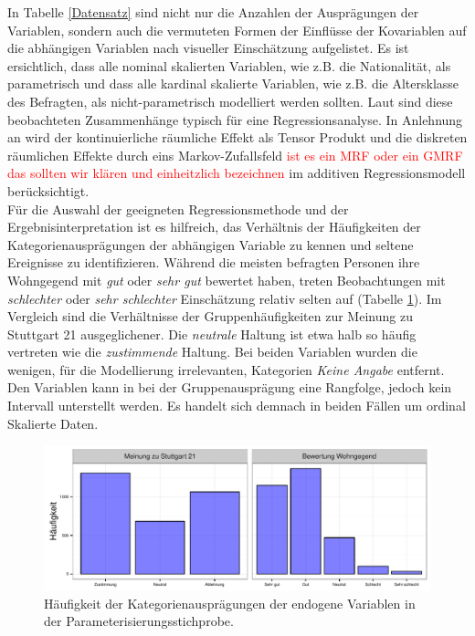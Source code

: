 \documentclass{Vorlage}
\begin{document}
In Tabelle \ref{Datensatz} sind nicht nur die Anzahlen der Ausprägungen der Variablen, sondern auch die vermuteten 
Formen der Einflüsse der Kovariablen auf die abhängigen Variablen nach visueller Einschätzung aufgelistet. Es ist 
ersichtlich, dass alle nominal skalierten Variablen, wie z.B. die Nationalität, als parametrisch und dass 
alle kardinal skalierte Variablen, wie z.B. die Altersklasse des Befragten, als nicht-parametrisch 
modelliert werden sollten. Laut \cite[p.9]{fahrmeir2009regression} sind diese beobachteten Zusammenhänge typisch für 
eine Regressionsanalyse. In Anlehnung an \cite[p. 503 ff. \& p. 524 ff.]{fahrmeir2013regression} wird der 
kontinuierliche räumliche Effekt als Tensor Produkt und die diskreten räumlichen Effekte durch eins 
Markov-Zufallsfeld \textcolor{red}{ist es ein MRF oder ein GMRF das sollten wir klären und einheitzlich bezeichnen} 
im additiven Regressionsmodell berücksichtigt.\\
Für die Auswahl der geeigneten Regressionsmethode und der Ergebnisinterpretation ist es hilfreich, das Verhältnis der 
Häufigkeiten der Kategorienausprägungen der abhängigen Variable zu kennen und seltene Ereignisse zu identifizieren. 
Während die meisten befragten Personen ihre Wohngegend mit \textit{gut} oder \textit{sehr gut} bewertet haben, treten 
Beobachtungen mit \textit{schlechter} oder \textit{sehr schlechter} Einschätzung relativ selten auf (Tabelle 
\ref{endogene}). Im Vergleich sind die Verhältnisse der Gruppenhäufigkeiten zur Meinung zu Stuttgart 21 
ausgeglichener. Die \textit{neutrale} Haltung ist etwa halb so häufig vertreten wie die \textit{zustimmende} Haltung. 
Bei beiden Variablen wurden die wenigen, für die Modellierung irrelevanten, Kategorien 
\textit{Keine Angabe} entfernt. Den Variablen kann in bei der Gruppenausprägung eine Rangfolge, jedoch kein 
Intervall unterstellt werden. Es handelt sich demnach in beiden Fällen um ordinal Skalierte Daten.

\begin{figure}[h]
 \begin{center}
 \includegraphics[scale=0.8]{Pictures/BarResp}
 \caption{Häufigkeit der Kategorienausprägungen der endogene Variablen in der Parameterisierungsstichprobe.}
 \label{endogene}
 \end{center}
\end{figure}
\end{document}
